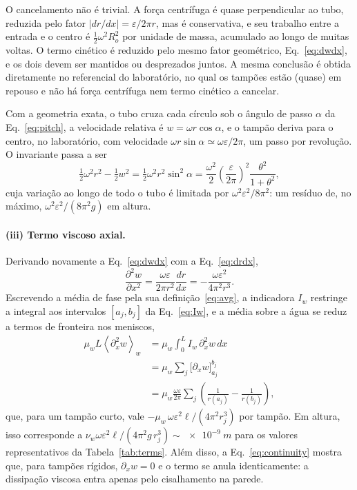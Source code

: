 \documentclass[aps,pre,twocolumn,superscriptaddress,nofootinbib,floatfix]{revtex4-2}
\newcommand{\avg}[1]{\left\langle #1 \right\rangle}
\begin{document}
O cancelamento não é trivial. A força centrífuga é quase perpendicular ao tubo, reduzida pelo fator $|dr/dx|=\varepsilon/2\pi r$, mas é conservativa, e seu trabalho entre a entrada e o centro é $\tfrac12\omega^2R_o^2$ por unidade de massa, acumulado ao longo de muitas voltas. O termo cinético é reduzido pelo mesmo fator geométrico, Eq.~\eqref{eq:dwdx}, e os dois devem ser mantidos ou desprezados juntos. A mesma conclusão é obtida diretamente no referencial do laboratório, no qual os tampões estão (quase) em repouso e não há força centrífuga nem termo cinético a cancelar.

Com a geometria exata, o tubo cruza cada círculo sob o ângulo de passo $\alpha$ da Eq.~\eqref{eq:pitch}, a velocidade relativa é $w=\omega r\cos\alpha$, e o tampão deriva para o centro, no laboratório, com velocidade $\omega r\sin\alpha\simeq\omega\varepsilon/2\pi$, um passo por revolução. O invariante passa a ser
\begin{equation}
  \tfrac12\omega^2r^2 - \tfrac12 w^2 = \tfrac12\omega^2r^2\sin^2\alpha
  = \frac{\omega^2}{2}\left(\frac{\varepsilon}{2\pi}\right)^2\frac{\theta^2}{1+\theta^2},
  \label{eq:bernoulli}
\end{equation}
cuja variação ao longo de todo o tubo é limitada por $\omega^2\varepsilon^2/8\pi^2$: um resíduo de, no máximo, $\omega^2\varepsilon^2/(8\pi^2g)$ em altura.

\paragraph*{(iii) Termo viscoso axial.} Derivando novamente a Eq.~\eqref{eq:dwdx} com a Eq.~\eqref{eq:drdx},
\begin{equation}
  \frac{\partial^2 w}{\partial x^2} = \frac{\omega\varepsilon}{2\pi r^2}\frac{dr}{dx} = -\frac{\omega\varepsilon^2}{4\pi^2r^3}.
\end{equation}
Escrevendo a média de fase pela sua definição~\eqref{eq:avg}, a indicadora $I_w$ restringe a integral aos intervalos $[a_j,b_j]$ da Eq.~\eqref{eq:Iw}, e a média sobre a água se reduz a termos de fronteira nos meniscos,
\begin{align}
  \mu_wL\avg{\partial_x^2w}_w &= \mu_w\!\int_0^L I_w\,\partial_x^2w\,dx \nonumber\\
  &= \mu_w\sum_j\Big[\partial_xw\Big]_{a_j}^{b_j} \nonumber\\
  &= \mu_w\frac{\omega\varepsilon}{2\pi}\sum_j\left(\frac{1}{r(a_j)}-\frac{1}{r(b_j)}\right),
  \label{eq:term_v}
\end{align}
que, para um tampão curto, vale $-\mu_w\,\omega\varepsilon^2\ell/(4\pi^2r_j^3)$ por tampão. Em altura, isso corresponde a $\nu_w\omega\varepsilon^2\ell/(4\pi^2g\,r_j^3)\sim\SI{e-9}{m}$ para os valores representativos da Tabela~\ref{tab:terms}. Além disso, a Eq.~\eqref{eq:continuity} mostra que, para tampões rígidos, $\partial_xw=0$ e o termo se anula identicamente: a dissipação viscosa entra apenas pelo cisalhamento na parede.
\end{document}
